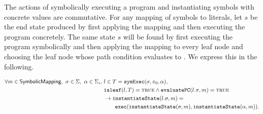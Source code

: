 \begin{property}[Commutativity]
  \label{prop:kingcommutativity}
  The actions of symbolically executing a program and instantiating symbols with
  concrete values are commutative. For any mapping of symbols to literals, let
  $s$ be the end state produced by first applying the mapping and then executing
  the program concretely. The
  same state $s$ will be found by first executing the program symbolically and
  then applying the mapping to every leaf node and choosing the leaf node whose path condition
  evaluates to \texttrue. We express this in the following.




\begin{align*}
\forall m \in \textsf{SymbolicMapping},~\sigma \in \Sigma,~\alpha \in \Sigma_i,~& l \in T = \mathtt{symExec}(\sigma,\pi_0,\alpha), \\
&\mathtt{isleaf}(l,T)  = \mathtt{\textsc{true}} \wedge
\mathtt{evaluatePC}(l.\pi,m) = \mathtt{\textsc{true}} \\
&\rightarrow \mathtt{instantiateState}(l.\sigma,m) = \\
&\qquad\mathtt{exec}(\mathtt{instantiateState}(\sigma,m),\mathtt{instantiateState}(\alpha,m)).
\end{align*}



\end{property}

